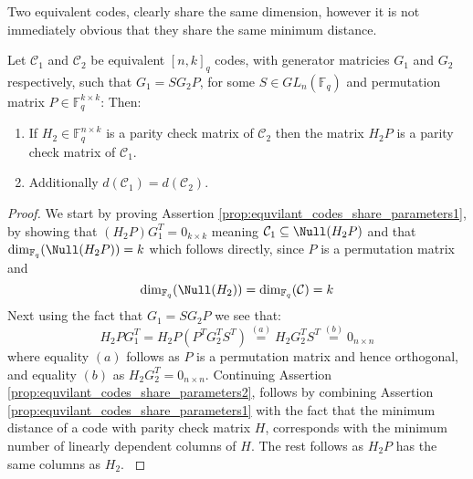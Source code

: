 Two equivalent codes, clearly share the same dimension, however it is not immediately obvious that they share the same minimum distance.
\begin{proposition}\label{prop:equvilant_codes_share_parameters}
  Let $\mathcal{C}_1$ and $\mathcal{C}_2$ be equivalent $[n, k]_q$ codes, with generator matricies $G_1$ and $G_2$ respectively, such that $G_1 = SG_2P$, for some $S \in GL_n(\mathbb{F}_q)$ and permutation matrix $P \in \mathbb{F}_q^{k \times k}$: Then:
  \begin{enumerate}
    \item If $H_2 \in \mathbb{F}_q^{n \times k}$ is a parity check matrix of $\mathcal{C}_2$ then the matrix $H_2 P$ is a parity check matrix of $\mathcal{C}_{1}$. \label{prop:equvilant_codes_share_parameters1}
    \item Additionally $d(\mathcal{C}_1) = d(\mathcal{C}_2)$. \label{prop:equvilant_codes_share_parameters2}
  \end{enumerate}
\end{proposition}
\begin{proof}
  We start by proving Assertion \ref{prop:equvilant_codes_share_parameters1}, by showing that $(H_2P)G_1^T = 0_{k \times k}$ meaning $\mathcal{C}_1 \subseteq \Null(H_2P)$ and that $\dim_{\mathbb{F}_q}(\Null(H_2P)) = k$ which follows directly, since $P$ is a permutation matrix and
  \begin{equation*}
    \dim_{\mathbb{F}_q}(\Null(H_2)) = \dim_{\mathbb{F}_q} (\mathcal{C}) = k
  \end{equation*}
  Next using the fact that $G_1 = SG_2P$ we see that:
  \begin{equation*}
    H_2PG_1^{T} = H_2P(P^TG_2^TS^T) \overset{(a)}{=} H_2G_2^TS^T \overset{(b)}{=} 0_{n \times n}
  \end{equation*}
  where equality $(a)$ follows as $P$ is a permutation matrix and hence orthogonal, and equality $(b)$ as $H_2G_{2}^{T} = 0_{n \times n}$.
  Continuing Assertion \ref{prop:equvilant_codes_share_parameters2}, follows by combining Assertion \ref{prop:equvilant_codes_share_parameters1} with the fact that the minimum distance of a code with parity check matrix $H$, corresponds with the minimum number of linearly dependent columns of $H$. The rest follows as $H_2P$ has the same columns as $H_2$.
  \label{}
\end{proof}

